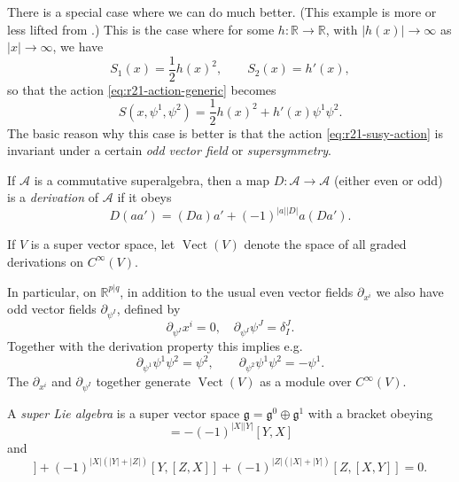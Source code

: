 \documentclass[12pt,letterpaper,reqno]{article}
\numberwithin{equation}{section}
\newcommand{\fg}{{\mathfrak g}}
\newcommand{\cA}{\ensuremath{\mathcal A}}
\newcommand{\R}{\ensuremath{\mathbb R}}
\newcommand{\half}{\ensuremath{\frac{1}{2}}}
\newcommand{\abs}[1]{\lvert#1\rvert}
\newcommand{\ti}[1]{\textit{#1}}
\DeclareMathOperator{\Vect}{Vect}
\begin{document}
There is a special case where we can do much better.
(This example is more or less lifted from \cite{MR2003030}.)
This is the case where for some $h: \R \to \R$, with $\abs{h(x)} \to \infty$ 
as $\abs{x} \to \infty$, we have
\begin{equation}
  S_1(x) = \half h(x)^2, \qquad S_2(x) = h'(x),
\end{equation}
so that the action \eqref{eq:r21-action-generic} becomes
\begin{equation}\label{eq:r21-susy-action}
  S(x, \psi^1, \psi^2) = \half h(x)^2 + h'(x) \psi^1 \psi^2.
\end{equation}
The basic reason why this case is better is that the
action \eqref{eq:r21-susy-action} is invariant under a 
certain \ti{odd vector field}
or \ti{supersymmetry}.

\begin{defn}
If $\cA$ is a commutative superalgebra, then a map $D: \cA \to \cA$
(either even or odd)
is a \ti{derivation} of $\cA$ if it obeys
\begin{equation}
  D(aa') = (Da)a' + (-1)^{\abs{a} \abs{D}} a(Da').
\end{equation}
\end{defn}

\begin{defn}
If $V$ is a super vector space, let $\Vect(V)$ denote the
space of all graded derivations on $C^\infty(V)$.
\end{defn}

In particular, on $\R^{p \vert q}$, in addition
to the usual even vector fields $\partial_{x^i}$ we also have
odd vector fields $\partial_{\psi^I}$, defined by
\begin{equation}
  \partial_{\psi^I} x^i = 0, \quad \partial_{\psi^I} \psi^J = \delta^J_I.
\end{equation}
Together with the derivation property this implies
e.g.
\begin{equation}
  \partial_{\psi^1} \psi^1 \psi^2 = \psi^2, \qquad \partial_{\psi^2} \psi^1 \psi^2 = - \psi^1.
\end{equation}
The $\partial_{x^i}$ and $\partial_{\psi^I}$ together
generate $\Vect(V)$ as a module over $C^\infty(V)$.

\begin{defn} A \ti{super Lie algebra} is a super
vector space $\fg = \fg^0 \oplus \fg^1$ with a bracket obeying
\begin{equation}
  [X,Y] = -(-1)^{\abs{X} \abs{Y}} [Y,X]
\end{equation}
and
\begin{equation}
[X,[Y,Z]] + (-1)^{\abs{X}(\abs{Y}+\abs{Z})} [Y,[Z,X]] + (-1)^{\abs{Z}(\abs{X}+\abs{Y})}[Z,[X,Y]] = 0.
\end{equation}
\end{defn}
\end{document}
